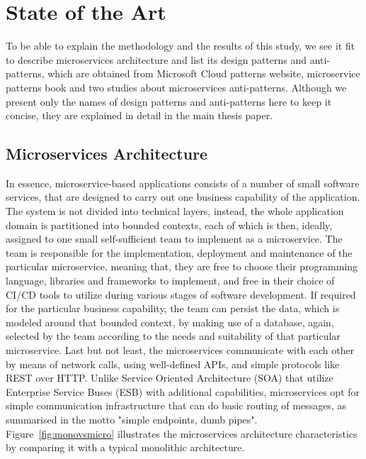 \documentclass[11pt,a4paper,twocolumn]{article}
\begin{document}

\section{State of the Art}
\label{sec:State of the Art}

To be able to explain the methodology and the results of this study, we see it fit to describe microservices architecture and list its design patterns and anti-patterns, which are obtained from Microsoft Cloud patterns website\cite{microsoft_docs}, microservice patterns book\cite{richardson_book} and two studies about microservices anti-patterns\cite{10.1145/3424771.3424812}\cite{9522227}.
Although we present only the names of design patterns and anti-patterns here to keep it concise, they are explained in detail in the main thesis paper.

\subsection{Microservices Architecture}
\label{subsec:microservice}

In essence, microservice-based applications consists of a number of small software services, that are designed to carry out one business capability of the application.
The system is not divided into technical layers, instead, the whole application domain is partitioned into bounded contexts, each of which is then, ideally, assigned to one small self-sufficient team to implement as a microservice.
The team is responsible for the implementation, deployment and maintenance of the particular microservice, meaning that, they are free to choose their programming language, libraries and frameworks to implement, and free in their choice of CI/CD tools to utilize during various stages of software development.
If required for the particular business capability, the team can persist the data, which is modeled around that bounded context, by making use of a database, again, selected by the team according to the needs and suitability of that particular microservice.
Last but not least, the microservices communicate with each other by means of network calls, using well-defined APIs, and simple protocols like REST over HTTP.
Unlike Service Oriented Architecture (SOA) that utilize Enterprise Service Buses (ESB) with additional capabilities, microservices opt for simple communication infrastructure that can do basic routing of messages, as summarised in the motto "simple endpoints, dumb pipes".
Figure~\ref{fig:monovsmicro} illustrates the microservices architecture characteristics by comparing it with a typical monolithic architecture.
\end{document}
